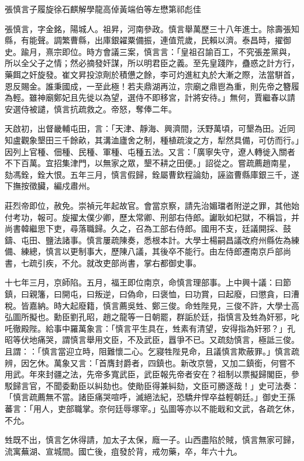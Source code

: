 
\begin{pinyinscope}
張慎言子履旋徐石麒解學龍高倬黃端伯等左懋第祁彪佳

張慎言，字金銘，陽城人。祖昇，河南參政。慎言舉萬歷三十八年進士。除壽張知縣，有能聲。調繁曹縣，出庫銀糴粟備振，連值荒歲，民賴以濟。泰昌時，擢御史。踰月，熹宗即位。時方會議三案，慎言言：「皇祖召諭百工，不究張差黨與，所以全父子之情；然必摘發奸謀，所以明君臣之義。至先皇踐阼，蠱惑之計方行，藥餌之奸旋發。崔文昇投涼劑於積憊之餘，李可灼進紅丸於大漸之際，法當駢首，恩反賜金。誰秉國成，一至此極！若夫鼎湖再泣，宗廟之鼎鬯為重，則先帝之簪履為輕。雖神廟鄭妃且先徙以為望，選侍不即移宮，計將安待。」無何，賈繼春以請安選侍被譴，慎言抗疏救之。帝怒，奪俸二年。

天啟初，出督畿輔屯田，言：「天津、靜海、興濟間，沃野萬頃，可墾為田。近同知盧觀象墾田三千餘畝，其溝洫廬舍之制，種植疏浚之方，犁然具備，可仿而行。」因列上官種、佃種、民種、軍種、屯種五法。又言：「廣寧失守，遼人轉徙入關者不下百萬。宜招集津門，以無家之眾，墾不耕之田便。」詔從之。嘗疏薦趙南星，劾馮銓，銓大恨。五年三月，慎言假歸，銓屬曹欽程論劾，誣盜曹縣庫銀三千，遂下撫按徵臟，編戍肅州。

莊烈帝即位，赦免。崇禎元年起故官。會當京察，請先治媚璫者附逆之罪，其他始付考功，報可。旋擢太僕少卿，歷太常卿、刑部右侍郎。讞耿如杞獄，不稱旨，并尚書韓繼思下吏，尋落職歸。久之，召為工部右侍郎。國用不支，廷議開採、鼓鑄、屯田、鹽法諸事。慎言屢疏陳奏，悉根本計。大學士楊嗣昌議改府州縣佐為練備、練總，慎言以更制事大，歷陳八議，其後卒不能行。由左侍郎遷南京戶部尚書，七疏引疾，不允。就改吏部尚書，掌右都御史事。

十七年三月，京師陷。五月，福王即位南京，命慎言理部事。上中興十議：曰節鎮，曰親籓，曰開屯，曰叛逆，曰偽命，曰褒恤，曰功賞，曰起廢，曰懲貪，曰漕稅。皆嘉納。時大起廢籍，慎言薦吳甡、鄭三俊。命甡陛見，三俊不許，大學士高弘圖所擬也。勳臣劉孔昭，趙之龍等一日朝罷，群詬於廷，指慎言及甡為奸邪，叱吒徹殿陛。給事中羅萬象言：「慎言平生具在，甡素有清望，安得指為奸邪？」孔昭等伏地痛哭，謂慎言舉用文臣，不及武臣，囂爭不已。又疏劾慎言，極詆三俊。且謂：：「慎言當迎立時，阻難懷二心。乞寢牲陛見命，且議慎言欺蔽罪。」慎言疏辨，因乞休。萬象又言：「首膺封爵者，四鎮也。新改京營，又加二鎮銜，何嘗不用武。年來封疆之法，先帝多寬武臣，武臣報先帝者安在？祖制以票擬歸閣臣，參駁歸言官，不聞委勳臣以糾劾也。使勛臣得兼糾劾，文臣可勝逐哉！」史可法奏：「慎言疏薦無不當。諸臣痛哭喧呼，滅絕法紀，恐驕弁悍卒益輕朝廷。」御史王孫蕃言：「用人，吏部職掌。奈何廷辱塚宰。」弘圖等亦以不能戢和文武，各疏乞休，不允。

甡既不出，慎言乞休得請，加太子太保，廕一子。山西盡陷於賊，慎言無家可歸，流寓蕪湖、宣城間。國亡後，疽發於背，戒勿藥，卒，年六十九。


\end{pinyinscope}
